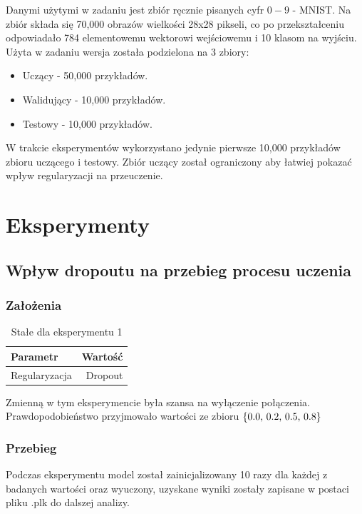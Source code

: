 \documentclass{article}
\begin{document}
Danymi użytymi w zadaniu jest zbiór ręcznie pisanych cyfr \(0-9\) - MNIST. Na zbiór składa się 70,000 obrazów wielkości 28x28 pikseli, co po przekształceniu odpowiadało 784 elementowemu wektorowi wejściowemu i 10 klasom na wyjściu. Użyta w zadaniu wersja została podzielona na 3 zbiory:
\begin{itemize}
	\item Uczący - 50,000 przykładów.
	\item Walidujący - 10,000 przykładów.
	\item Testowy - 10,000 przykładów.
\end{itemize}
W trakcie eksperymentów wykorzystano jedynie pierwsze 10,000 przykładów zbioru uczącego i testowy. Zbiór uczący został ograniczony aby łatwiej pokazać wpływ regularyzacji na przeuczenie.

\newpage
\section{Eksperymenty}

\subsection{Wpływ dropoutu na przebieg procesu uczenia}
\subsubsection*{Założenia}
\begin{table}[H]
	\caption{Stałe dla eksperymentu 1}
	\label{tabela-const-1}
	\centering
	\begin{tabular}{lr}
		\toprule
		Parametr      & Wartość \\
		\midrule
		Regularyzacja & Dropout   \\
		\bottomrule
	\end{tabular}
\end{table}

Zmienną w tym eksperymencie była szansa na wyłączenie połączenia. Prawdopodobieństwo przyjmowało wartości ze zbioru \(\{$0.0, 0.2, 0.5, 0.8$\}\)
\subsubsection*{Przebieg}

Podczas eksperymentu model został zainicjalizowany 10 razy dla każdej z badanych wartości oraz wyuczony, uzyskane wyniki zostały zapisane w postaci pliku .plk do dalszej analizy.
\end{document}
